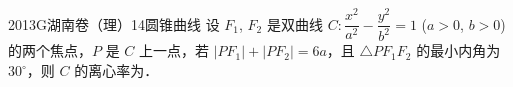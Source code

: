 
\begin{problem}{2013}{G}{湖南卷（理）}{14}{圆锥曲线}
设 $ F_1 $, $ F_2 $ 是双曲线 $ C\colon \dfrac{x^2}{a^2}-\dfrac{y^2}{b^2}=1 $ ($ a>0 $, $ b>0 $) 的两个焦点，$ P $ 是 $ C $ 上一点，若 $ |PF_1|+|PF_2|=6a $，且 $ \triangle PF_1F_2 $ 的最小内角为 $ 30^\circ $，则 $ C $ 的离心率为．
\end{problem}

\begin{answer}

\end{answer}

\begin{solutions}

\end{solutions}